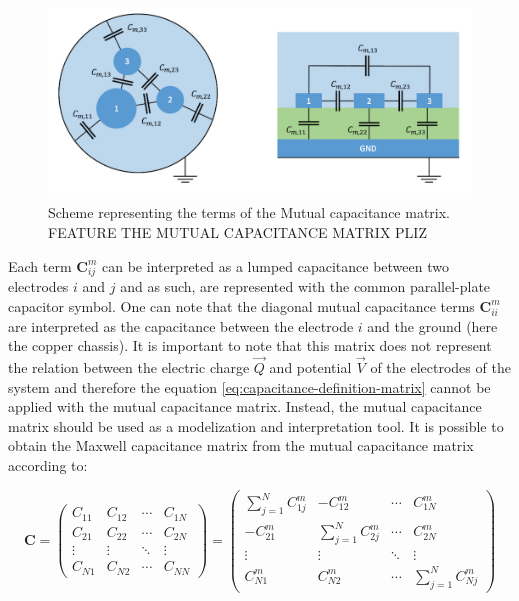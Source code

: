 \begin{figure}
\centering
\includegraphics[width=\linewidth]{Figures/Electrodes/lumped_capacitance_scheme.png}
\caption{Scheme representing the terms of the Mutual capacitance matrix. FEATURE THE MUTUAL CAPACITANCE MATRIX PLIZ}
\label{fig:lumped-capacitance}
\end{figure}

Each term $\bm{C}_{ij}^m$ can be interpreted as a lumped capacitance between two electrodes $i$ and $j$ and as such, are represented with the common parallel-plate capacitor symbol. One can note that the diagonal mutual capacitance terms $\bm{C}_{ii}^m$ are interpreted as the capacitance between the electrode $i$ and the ground (here the copper chassis). It is important to note that this matrix does not represent the relation between the electric charge $\vec{Q}$ and potential $\vec{V}$ of the electrodes of the system and therefore the equation \ref{eq:capacitance-definition-matrix} cannot be applied with the mutual capacitance matrix. Instead, the mutual capacitance matrix should be used as a modelization and interpretation tool. It is possible to obtain the Maxwell capacitance matrix from the mutual capacitance matrix according to:

\begin{equation} 
\label{eq:mutual-to-maxwell}
\bm{C} = 
\begin{pmatrix}
C_{11} & C_{12} & \cdots & C_{1N} \\ 
C_{21} & C_{22} & \cdots & C_{2N} \\ 
\vdots & \vdots & \ddots & \vdots \\ 
C_{N1} & C_{N2} & \cdots & C_{NN}
\end{pmatrix}
 = 
\begin{pmatrix}
\sum_{j=1}^N C_{1j}^m & -C_{12}^m & \cdots & C_{1N}^m \\[0.3em]
-C_{21}^m & \sum_{j=1}^N C_{2j}^m & \cdots & C_{2N}^m \\[0.3em]
\vdots & \vdots & \ddots & \vdots \\[0.3em] 
C_{N1}^m & C_{N2}^m & \cdots & \sum_{j=1}^N C_{Nj}^m
\end{pmatrix}
\end{equation}

